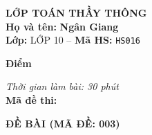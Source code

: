 \noindent
\begin{tcolorbox}[colback=white,colframe=black,arc=0mm,boxrule=0.8pt,top=4pt,bottom=4pt,left=6pt,right=6pt]
	\begin{minipage}[c]{0.44\textwidth}
		{\bfseries\large LỚP TOÁN THẦY THÔNG}\\[3pt]
		\textbf{Họ và tên:} \textbf{\large Ngân Giang}\\[3pt]
		\textbf{Lớp:} LỚP 10 \quad -- \quad \textbf{Mã HS:} \texttt{HS016}
	\end{minipage}
	\hfill
	\begin{minipage}[c]{0.22\textwidth}
		\begin{tcolorbox}[colback=white,colframe=black,arc=0mm,boxrule=0.6pt,height=1.8cm,halign=center,valign=top,top=2pt]
			{\bfseries\normalsize Điểm}
		\end{tcolorbox}
	\end{minipage}
	\hfill
	\begin{minipage}[c]{0.30\textwidth}
		\raggedleft
		\textit{Thời gian làm bài: 30 phút}\\[4pt]
		\textbf{Mã đề thi:} 
	\end{minipage}
\end{tcolorbox}
\vspace{0.25cm}

\noindent\textbf{\large ĐỀ BÀI (MÃ ĐỀ: 003)}
\vspace{0.1cm}

